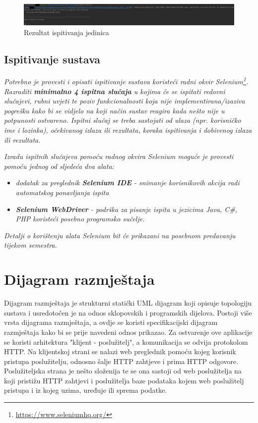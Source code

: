 			\begin{figure}[H]
				\includegraphics[width=1\linewidth]{slike/unit_test_result.PNG} %
				\caption{Rezultat ispitivanja jedinica}
				\label{fig:unit2} %
			\end{figure}
			
			
			\subsection{Ispitivanje sustava}
			
			 \textit{Potrebno je provesti i opisati ispitivanje sustava koristeći radni okvir Selenium\footnote{\url{https://www.seleniumhq.org/}}. Razraditi \textbf{minimalno 4 ispitna slučaja} u kojima će se ispitati redovni slučajevi, rubni uvjeti te poziv funkcionalnosti koja nije implementirana/izaziva pogrešku kako bi se vidjelo na koji način sustav reagira kada nešto nije u potpunosti ostvareno. Ispitni slučaj se treba sastojati od ulaza (npr. korisničko ime i lozinka), očekivanog izlaza ili rezultata, koraka ispitivanja i dobivenog izlaza ili rezultata.\\ }
			 
			 \textit{Izradu ispitnih slučajeva pomoću radnog okvira Selenium moguće je provesti pomoću jednog od sljedeća dva alata:}
			 \begin{itemize}
			 	\item \textit{dodatak za preglednik \textbf{Selenium IDE} - snimanje korisnikovih akcija radi automatskog ponavljanja ispita	}
			 	\item \textit{\textbf{Selenium WebDriver} - podrška za pisanje ispita u jezicima Java, C\#, PHP koristeći posebno programsko sučelje.}
			 \end{itemize}
		 	\textit{Detalji o korištenju alata Selenium bit će prikazani na posebnom predavanju tijekom semestra.}
			
			\eject 
		
		
		\section{Dijagram razmještaja}
			
			 Dijagram razmještaja je strukturni statički UML dijagram koji opisuje topologiju sustava i usredotočen je na odnos sklopovskih i programskih dijelova. Postoji više vrsta dijagrama razmještaja, a ovdje se koristi specifikacijski dijagram razmještaja kako bi se prije navedeni odnos prikazao. Za ostvarenje ove aplikacije se koristi arhitektura "klijent - poslužitelj", a komunikacija se odvija protokolom HTTP. Na klijentskoj strani se nalazi web preglednik pomoću kojeg korisnik pristupa poslužitelju, odnosno šalje HTTP zahtjeve i prima HTTP odgovore. Poslužiteljska strana je nešto složenija te se ona sastoji od web poslužitelja na koji pristižu HTTP zahtjevi i poslužitelja baze podataka kojem web poslužitelj pristupa i iz kojeg uzima, uređuje ili sprema podatke.
			 
